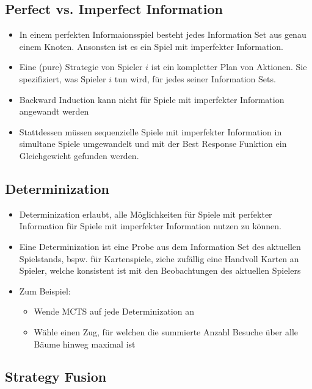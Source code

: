 \documentclass[a4paper]{article}
\begin{document}
		\subsection{Perfect vs. Imperfect Information}
		
		\begin{itemize}
			\item In einem perfekten Informaionsspiel besteht jedes Information Set aus genau einem Knoten.
				Ansonsten ist es ein Spiel mit imperfekter Information.
			\item Eine (pure) Strategie von Spieler $i$ ist ein kompletter Plan von Aktionen.
				Sie spezifiziert, was Spieler $i$ tun wird, für jedes seiner Information Sets.
			\item Backward Induction kann nicht für Spiele mit imperfekter Information angewandt werden
			\item Stattdessen müssen sequenzielle Spiele mit imperfekter Information in simultane Spiele umgewandelt und mit der Best Response Funktion ein Gleichgewicht gefunden werden.
		\end{itemize}
	
		\subsection{Determinization}
		
		\begin{itemize}
			\item Determinization erlaubt, alle Möglichkeiten für Spiele mit perfekter Information für Spiele mit imperfekter Information nutzen zu können.
			\item Eine Determinization ist eine Probe aus dem Information Set des aktuellen Spielstands, bspw. für Kartenspiele, ziehe zufällig eine Handvoll Karten an Spieler, welche konsistent ist mit den Beobachtungen des aktuellen Spielers
			\item Zum Beispiel:
				\begin{itemize}
					\item Wende MCTS auf jede Determinization an
					\item Wähle einen Zug, für welchen die summierte Anzahl Besuche über alle Bäume hinweg maximal ist
				\end{itemize}
		\end{itemize}
	
		\subsection{Strategy Fusion}
		
\end{document}
